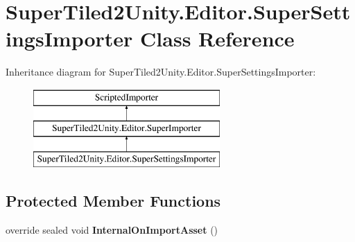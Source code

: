 \hypertarget{class_super_tiled2_unity_1_1_editor_1_1_super_settings_importer}{}\section{Super\+Tiled2\+Unity.\+Editor.\+Super\+Settings\+Importer Class Reference}
\label{class_super_tiled2_unity_1_1_editor_1_1_super_settings_importer}
Inheritance diagram for Super\+Tiled2\+Unity.\+Editor.\+Super\+Settings\+Importer\+:\begin{figure}[H]
\begin{center}
\leavevmode
\includegraphics[height=3.000000cm]{class_super_tiled2_unity_1_1_editor_1_1_super_settings_importer}
\end{center}
\end{figure}
\subsection*{Protected Member Functions}
\begin{DoxyCompactItemize}
\item 
\mbox{\label{class_super_tiled2_unity_1_1_editor_1_1_super_settings_importer_a296320821c64792e0cad1c9395d156f2}} 
override sealed void {\bfseries Internal\+On\+Import\+Asset} ()
\end{DoxyCompactItemize}
